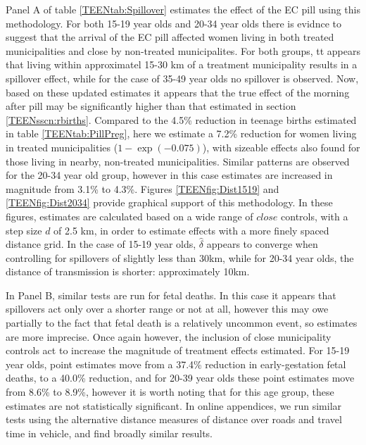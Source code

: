 Panel A of table \ref{TEENtab:Spillover} estimates the effect of the EC pill 
using this methodology. For both 15-19 year olds and 20-34 year olds there is
evidnce to suggest that the arrival of the EC pill affected women living in both
treated municipalities and close by non-treated municipalites. For both groups,
tt appears that living within approximatel 15-30 km of a treatment municipality 
results in a spillover effect, while for the case of 35-49 year olds no spillover
is observed.  Now, based on these updated estimates it appears that the true 
effect of the morning after pill may be significantly higher than that estimated 
in section \ref{TEENsscn:rbirths}.  Compared to the 4.5\% reduction in teenage 
births estimated in table \ref{TEENtab:PillPreg}, here we estimate a 7.2\% 
reduction for women living in treated municipalities ($1-\exp(-0.075)$), with 
sizeable effects also found for those living in nearby, non-treated 
municipalities.  Similar patterns are observed for the 20-34 year old group,
however in this case estimates are increased in magnitude from 3.1\% to 4.3\%.
Figures \ref{TEENfig:Dist1519} and \ref{TEENfig:Dist2034} provide graphical
support of this methodology.  In these figures, estimates are calculated based on 
a wide range of $close$ controls, with a step size $d$ of 2.5 km, in order to 
estimate effects with a more finely spaced distance grid.  In the case of 15-19 
year olds, $\hat\delta$ appears to converge when controlling for spillovers of 
slightly less than 30km, while for 20-34 year olds, the distance of transmission 
is shorter: approximately 10km.

In Panel B, similar tests are run for fetal deaths.  In this case it appears 
that spillovers act only over a shorter range or not at all, however this may 
owe partially to the fact that fetal death is a relatively uncommon event, so 
estimates are more imprecise.  Once again however, the inclusion of close 
municipality controls act to increase the magnitude of treatment effects 
estimated.  For 15-19 year olds, point estimates move from a 37.4\% reduction 
in early-gestation fetal deaths, to a 40.0\% reduction, and for 20-39 year olds
these point estimates move from 8.6\% to 8.9\%, however it is worth noting 
that for this age group, these estimates are not statistically significant.
In online appendices, we run similar tests using the alternative distance 
measures of distance over roads and travel time in vehicle, and find broadly
similar results.

